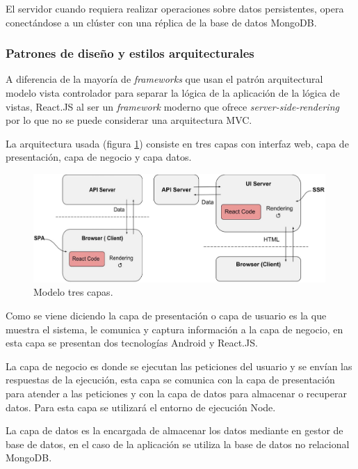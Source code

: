 \documentclass{article}
\begin{document}
El servidor cuando requiera realizar operaciones sobre datos persistentes, opera conectándose a un clúster con una réplica de la base de datos MongoDB.

\pagebreak

\subsubsection*{Patrones de diseño y estilos arquitecturales}

A diferencia de la mayoría de \textit{frameworks} que usan el patrón arquitectural modelo vista controlador para separar la lógica de la aplicación de la lógica de vistas, React.JS al ser un \textit{framework} moderno que ofrece \textit{server-side-rendering} por lo que no se puede considerar una arquitectura MVC.
 
La arquitectura usada (figura \ref{patron}) consiste en tres capas con interfaz web, capa de presentación, capa de negocio y capa datos.

\begin{figure}[H]
    \centering
        \includegraphics[width=0.99\textwidth]{../images/patron.jpg}
    \caption{Modelo tres capas.}
    \label{patron}
\end{figure}

Como se viene diciendo la capa de presentación o capa de usuario es la que muestra el sistema, le comunica y captura información a la capa de negocio, en esta capa se presentan dos tecnologías Android y React.JS.
 
La capa de negocio es donde se ejecutan las peticiones del usuario y se envían las respuestas de la ejecución, esta capa se comunica con la capa de presentación para atender a las peticiones y con la capa de datos para almacenar o recuperar datos. Para esta capa se utilizará el entorno de ejecución Node.
 
La capa de datos es la encargada de almacenar los datos mediante en gestor de base de datos, en el caso de la aplicación se utiliza la base de datos no relacional MongoDB.
\end{document}
